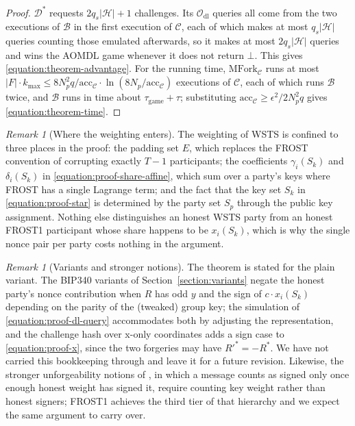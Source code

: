 \documentclass{article}
\theoremstyle{plain}
\theoremstyle{definition}
\theoremstyle{remark}
\newtheorem{rem}[thm]{Remark}
\begin{document}
\begin{proof}
  $\mathcal{D}^*$ requests $2 q_s |\mathcal{H}| + 1$ challenges.  Its $\mathcal{O}_{\mathrm{dl}}$ queries all come from the two executions of $\mathcal{B}$ in the first execution of $\mathcal{C}$, each of which makes at most $q_s |\mathcal{H}|$ queries counting those emulated afterwards, so it makes at most $2 q_s |\mathcal{H}|$ queries and wins the AOMDL game whenever it does not return $\bot$.  This gives \eqref{equation:theorem-advantage}.  For the running time, $\mathrm{MFork}_{\mathcal{C}}$ runs at most $|F| \cdot k_{\max} \le 8 N_p^2 q / \mathrm{acc}_{\mathcal{C}} \cdot \ln(8 N_p / \mathrm{acc}_{\mathcal{C}})$ executions of $\mathcal{C}$, each of which runs $\mathcal{B}$ twice, and $\mathcal{B}$ runs in time about $\tau_{\mathrm{game}} + \tau$; substituting $\mathrm{acc}_{\mathcal{C}} \ge \epsilon^2 / 2 N_p^2 q$ gives \eqref{equation:theorem-time}.
\end{proof}

\begin{rem}[Where the weighting enters]
  The weighting of WSTS is confined to three places in the proof: the padding set $E$, which replaces the FROST convention of corrupting exactly $T-1$ participants; the coefficients $\gamma_i(S_k)$ and $\delta_i(S_k)$ in \eqref{equation:proof-share-affine}, which sum over a party's keys where FROST has a single Lagrange term; and the fact that the key set $S_k$ in \eqref{equation:proof-star} is determined by the party set $S_p$ through the public key assignment.  Nothing else distinguishes an honest WSTS party from an honest FROST1 participant whose share happens to be $x_i(S_k)$, which is why the single nonce pair per party costs nothing in the argument.
\end{rem}

\begin{rem}[Variants and stronger notions]
  The theorem is stated for the plain variant.  The BIP340 variants of Section~\ref{section:variants} negate the honest party's nonce contribution when $R$ has odd $y$ and the sign of $c \cdot x_i(S_k)$ depending on the parity of the (tweaked) group key; the simulation of \eqref{equation:proof-dl-query} accommodates both by adjusting the representation, and the challenge hash over x-only coordinates adds a sign case to \eqref{equation:proof-x}, since the two forgeries may have $R'^* = -R^*$.  We have not carried this bookkeeping through and leave it for a future revision.  Likewise, the stronger unforgeability notions of \cite{btz22}, in which a message counts as signed only once enough honest weight has signed it, require counting key weight rather than honest signers; FROST1 achieves the third tier of that hierarchy \cite[Theorem~5.4]{btz22} and we expect the same argument to carry over.
\end{rem}
\end{document}
